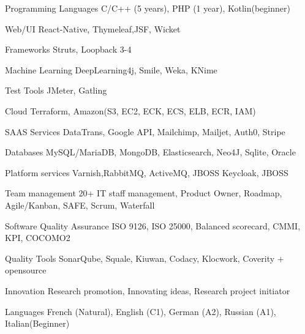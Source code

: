 \begin{cvskills}

  \cvskill
  {Programming Languages} %
  {C/C++ (5 years), PHP (1 year), Kotlin(beginner)} %

  \cvskill
  {Web/UI} %
  {React-Native, Thymeleaf,JSF, Wicket} %

  \cvskill
  {Frameworks} %
  {Struts, Loopback 3-4} %

  \cvskill
  {Machine Learning} %
  {DeepLearning4j, Smile, Weka, KNime} %

  
  \cvskill
  {Test Tools} %
  {JMeter, Gatling} %

  \cvskill
  {Cloud} %
  {Terraform, Amazon(S3, EC2, ECK, ECS, ELB, ECR, IAM)} %

  \cvskill
  {SAAS Services} %
  {DataTrans, Google API, Mailchimp, Mailjet, Auth0, Stripe} %

  \cvskill
  {Databases} %
  {MySQL/MariaDB, MongoDB, Elasticsearch, Neo4J, Sqlite, Oracle} %
  

  \cvskill
  {Platform services} %
  {Varnish,RabbitMQ, ActiveMQ, JBOSS Keycloak, JBOSS} %

\end{cvskills}




\begin{cvskills}
  \cvskill
  {Team management} %
  {20+ IT staff management, Product Owner, Roadmap, Agile/Kanban, SAFE, Scrum, Waterfall} %


  \cvskill
  {Software Quality Assurance} %
  {ISO 9126, ISO 25000, Balanced scorecard, CMMI, KPI, COCOMO2} %

  \cvskill
  {Quality Tools} %
  {SonarQube, Squale, Kiuwan, Codacy, Klocwork, Coverity + opensource} %


  \cvskill
  {Innovation} %
  {Research promotion, Innovating ideas, Research project initiator} %

  \cvskill
  {Languages} %
  {French (Natural), English (C1), German (A2), Russian (A1), Italian(Beginner)} %


\end{cvskills}
